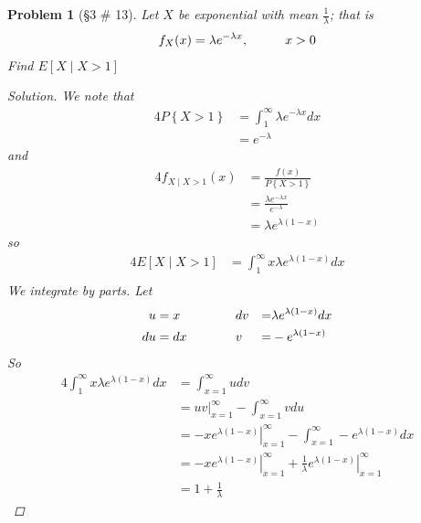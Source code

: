 \documentclass[11pt, oneside]{book}   	%
\newtheorem{problem}{Problem}[chapter]
\newcommand{\set}[1]{\left\{#1\right\}}
\begin{document}
\begin{problem}[\S 3 \# 13]
	Let $X$ be exponential with mean $\frac{1}{\lambda}$; that is 
	\begin{alignat}{4}
		f_X(x)=\lambda e^{-\lambda x},\hspace{1 cm}x>0
	\end{alignat}
	Find $E[X\mid X>1]$
	\begin{proof}[Solution]
		We note that 
		\begin{alignat}{4}
			P \set{X>1}&=\int_1^\infty \lambda e^{-\lambda x} dx \\
				&=e^{-\lambda}
		\end{alignat}
		and 
		\begin{alignat}{4}
			f_{X\mid X>1}(x)&=\frac{f(x)}{P\set{X>1}} \\
				&=\frac{\lambda e^{-\lambda x}}{ e^{-\lambda }} \\
				&=\lambda e^{\lambda(1-x)}
		\end{alignat}
		so 
		\begin{alignat}{4}
			E[X\mid X>1]&=\int_1^\infty x \lambda e^{\lambda(1-x)} dx \\
		\end{alignat}
		We integrate by parts. Let 
		\begin{alignat}{5}
				u&=x&\hspace{1 cm}&dv &=& \lambda e^{\lambda(1-x)}dx \\
				du&=dx&\hspace{1 cm}&v &=& -e^{\lambda(1-x)}
		\end{alignat}
		So 
		\begin{alignat}{4}
			\int_1^\infty x \lambda e^{\lambda(1-x)} dx&=\int_{x=1}^\infty udv \\
				&=\left. uv\right|_{x=1}^\infty - \int_{x=1}^\infty v du \\
				&=\left. -xe^{\lambda(1-x)} \right|_{x=1}^\infty -\int_{x=1}^\infty -e^{\lambda(1-x)} dx \\
				&=\left. -xe^{\lambda(1-x)} \right|_{x=1}^\infty +\left. \frac{1}{\lambda} e^{\lambda(1-x)}\right|_{x=1}^\infty \\
				&=1+\frac{1}{\lambda}
		\end{alignat}
	\end{proof}
\end{problem}
\end{document}
